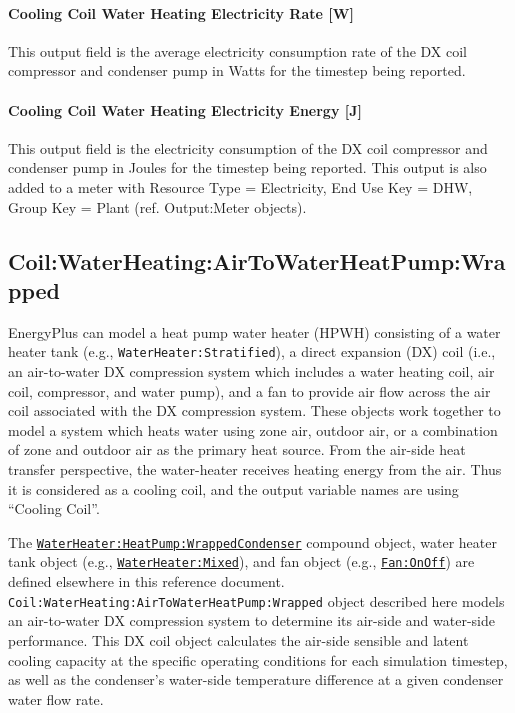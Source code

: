 \paragraph{Cooling Coil Water Heating Electricity Rate {[}W{]}}\label{heating-coil-water-heating-electric-powerw}

This output field is the average electricity consumption rate of the DX coil compressor and condenser pump in Watts for the timestep being reported.

\paragraph{Cooling Coil Water Heating Electricity Energy {[}J{]}}\label{heating-coil-water-heating-electric-energy-j}

This output field is the electricity consumption of the DX coil compressor and condenser pump in Joules for the timestep being reported. This output is also added to a meter with Resource Type = Electricity, End Use Key = DHW, Group Key = Plant (ref. Output:Meter objects).


\subsection{Coil:WaterHeating:AirToWaterHeatPump:Wrapped}\label{coilwaterheatingairtowaterheatpumpwrapped}

EnergyPlus can model a heat pump water heater (HPWH) consisting of a water heater tank (e.g., \lstinline!WaterHeater:Stratified!), a direct expansion (DX) coil (i.e., an air-to-water DX compression system which includes a water heating coil, air coil, compressor, and water pump), and a fan to provide air flow across the air coil associated with the DX compression system. These objects work together to model a system which heats water using zone air, outdoor air, or a combination of zone and outdoor air as the primary heat source. From the air-side heat transfer perspective, the water-heater receives heating energy from the air. Thus it is considered as a cooling coil, and the output variable names are using ``Cooling Coil''.

The \hyperref[waterheaterheatpumpwrappedcondenser]{\lstinline!WaterHeater:HeatPump:WrappedCondenser!} compound object, water heater tank object (e.g., \hyperref[waterheatermixed]{\lstinline!WaterHeater:Mixed!}), and fan object (e.g., \hyperref[fanonoff]{\lstinline!Fan:OnOff!}) are defined elsewhere in this reference document. \lstinline!Coil:WaterHeating:AirToWaterHeatPump:Wrapped! object described here models an air-to-water DX compression system to determine its air-side and water-side performance. This DX coil object calculates the air-side sensible and latent cooling capacity at the specific operating conditions for each simulation timestep, as well as the condenser's water-side temperature difference at a given condenser water flow rate.

